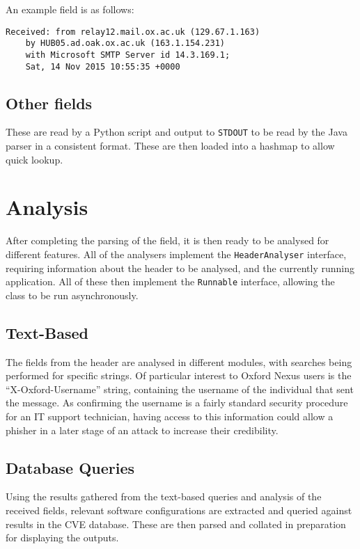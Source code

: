 An example field is as follows:
\begin{verbatim}
Received: from relay12.mail.ox.ac.uk (129.67.1.163) 
    by HUB05.ad.oak.ox.ac.uk (163.1.154.231) 
    with Microsoft SMTP Server id 14.3.169.1;
    Sat, 14 Nov 2015 10:55:35 +0000
\end{verbatim}
\subsection{Other fields}
These are read by a Python script and output to \texttt{STDOUT} to be read by the Java parser in a consistent format.  These are then loaded into a hashmap to allow quick lookup.

\section{Analysis}
After completing the parsing of the field, it is then ready to be analysed for different features.  All of the analysers implement the \texttt{HeaderAnalyser} interface, requiring information about the header to be analysed, and the currently running application.  All of these then implement the \texttt{Runnable} interface, allowing the class to be run asynchronously.

\subsection{Text-Based}
The fields from the header are analysed in different modules, with searches being performed for specific strings.  Of particular interest to Oxford Nexus users is the ``X-Oxford-Username'' string, containing the username of the individual that sent the message.  As confirming the username is a fairly standard security procedure for an IT support technician, having access to this information could allow a phisher in a later stage of an attack to increase their credibility.

\subsection{Database Queries}
Using the results gathered from the text-based queries and analysis of the received fields, relevant software configurations are extracted and queried against results in the CVE database.  These are then parsed and collated in preparation for displaying the outputs.
